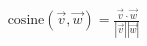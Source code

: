 \documentclass[preview]{standalone}
\begin{document}
\begin{align*}
\text{cosine}(\vec{v}, \vec{w}) = \frac{\vec{v} \cdot \vec{w}}{|\vec{v}| |\vec{w}|}
\end{align*}
\end{document}
